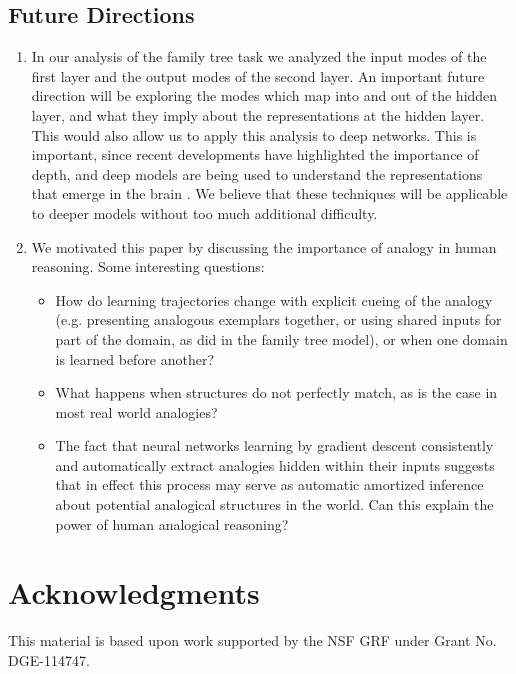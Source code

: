 \documentclass[10pt,letterpaper]{article}
\begin{document}
\subsection{Future Directions}
\begin{enumerate}
\itemsep0em
\item In our analysis of the family tree task we analyzed the input modes of the first layer and the output modes of the second layer. An important future direction will be exploring the modes which map into and out of the hidden layer, and what they imply about the representations at the hidden layer. This would also allow us to apply this analysis to deep networks. This is important, since recent developments have highlighted the importance of depth, and deep models are being used to understand the representations that emerge in the brain \citep[e.g.]{Yamins2016a}. We believe that these techniques will be applicable to deeper models without too much additional difficulty. 
\item We motivated this paper by discussing the importance of analogy in human reasoning. Some interesting questions:
\begin{itemize}
\itemsep0em
\item How do learning trajectories change with explicit cueing of the analogy (e.g. presenting analogous exemplars together, or using shared inputs for part of the domain, as \citet{Hinton1986} did in the family tree model), or when one domain is learned before another?
\item What happens when structures do not perfectly match, as is the case in most real world analogies?
\item The fact that neural networks learning by gradient descent consistently and automatically extract analogies hidden within their inputs suggests that in effect this process may serve as automatic amortized inference about potential analogical structures in the world. Can this explain the power of human analogical reasoning?  
\end{itemize}
\end{enumerate}
\section{Acknowledgments}
This material is based upon work supported by the NSF GRF under Grant No. DGE-114747.


\setlength{\bibleftmargin}{.125in}
\setlength{\bibindent}{-\bibleftmargin}


\end{document}
